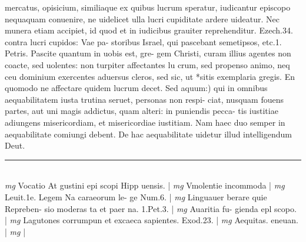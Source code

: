 \documentclass{article}
\begin{document}
\begin{pages}
mercatus, opisicium, similiaque ex quibus lucrum speratur, iudicantur episcopo nequaquam conuenire, ne uidelicet ulla lucri cupiditate ardere uideatur. Nec munera etiam accipiet, id quod et in iudicibus grauiter reprehenditur. Ezech.34. contra lucri cupidos: Vae pa- storibus Israel, qui pascebant semetipsos, etc.1. Petris. Pascite quantum in uobis est, gre- gem Christi, curam illius agentes non coacte, sed uolentes: non turpiter affectantes lu crum, sed propenso animo, neq ceu dominium exercentes aduersus cleros, sed sic, ut *sitis exemplaria gregis. En quomodo ne affectare quidem lucrum decet.  \pend\pstart Sed aquum:) qui in omnibus aequabilitatem iusta trutina seruet, personas non respi- ciat, nusquam fouens partes, aut uni magis addictus, quam alteri: in puniendis pecca- tis iustitiae adiungens misericordiam, et misericordiae iustitiam. Nam haec duo semper in aequabilitate comiungi debent. De hac aequabilitate uidetur illud intelligendum Deut.  \pend\pstart  \pend
\vspace{0.5cm}\noindent
\vspace{0.2cm}\rule{1cm}{0.2pt}\\ 
\hspace{0.2cm}\textit{mg}
\footnotesize Vocatio At gustini epi scopi Hipp uensis. 
\normalsize| 
\hspace{0.2cm}\textit{mg}
\footnotesize Vmolentie incommoda 
\normalsize| 
\hspace{0.2cm}\textit{mg}
\footnotesize Leuit.1e. Legem Na caraeorum le- ge Num.6. 
\normalsize| 
\hspace{0.2cm}\textit{mg}
\footnotesize Linguauer berare quie Repreben- sio moderas ta et paer na. 1.Pet.3. 
\normalsize| 
\hspace{0.2cm}\textit{mg}
\footnotesize Auaritia fu- gienda epl scopo. 
\normalsize| 
\hspace{0.2cm}\textit{mg}
\footnotesize Lagutones corrumpun et excaeca sapientes. Exod.23. 
\normalsize| 
\hspace{0.2cm}\textit{mg}
\footnotesize Aequitas. eneuan. 
\normalsize| 
\hspace{0.2cm}\textit{mg}
\footnotesize 
\normalsize| 

\end{pages}
\end{document}
